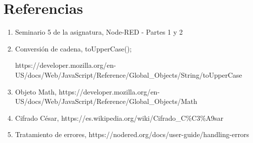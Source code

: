 \documentclass{article}
\begin{document}

\section*{Referencias}
\begin{enumerate}

 \item Seminario 5 de la asignatura, Node-RED - Partes 1 y 2
 \item Conversión de cadena, toUpperCase(); 

 https://developer.mozilla.org/en-US/docs/Web/JavaScript/Reference/Global\_Objects/String/toUpperCase
 \item Objeto Math, https://developer.mozilla.org/en-US/docs/Web/JavaScript/Reference/Global\_Objects/Math
 \item Cifrado César, https://es.wikipedia.org/wiki/Cifrado\_C\%C3\%A9sar
 \item Tratamiento de errores, https://nodered.org/docs/user-guide/handling-errors
\end{enumerate}
\end{document}
